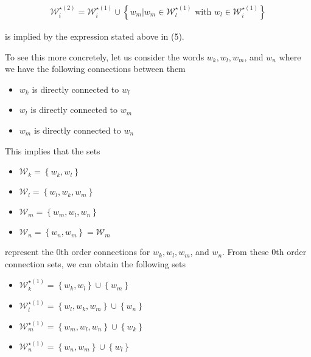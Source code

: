\documentclass{article}[12pt]
\begin{document}
\begin{flushleft}
\begin{align*}
\mathcal{W}^{\star (2)}_i = \mathcal{W}^{\star (1)}_i \cup \left\{ w_m | w_m \in \mathcal{W}^{\star (1)}_l \text{ with } w_l \in \mathcal{W}^{\star (1)}_i \right\}
\end{align*}

is implied by the expression stated above in (5). \newline


To see this more concretely, let us consider the words $w_k, w_l, w_m$, and $w_n$ where we have the following connections between them

\begin{itemize}
	\item $w_k$ is directly connected to $w_l$
	\item $w_l$ is directly connected to $w_m$
	\item $w_m$ is directly connected to $w_n$
\end{itemize}

This implies that the sets

\begin{multicols}{2}
	\begin{itemize}
		\item $\mathcal{W}_k = \left\{ w_k, w_l \right\}$
		\item $\mathcal{W}_l = \left\{ w_l, w_k, w_m \right\}$
		\item $\mathcal{W}_m = \left\{ w_m, w_l, w_n \right\}$
		\item $\mathcal{W}_n = \left\{ w_n, w_m \right\} = \mathcal{W}_m$
	\end{itemize}
\end{multicols}

represent the 0th order connections for $w_k, w_l, w_m$, and $w_n$. From these 0th order connection sets, we can obtain the following sets 

\begin{multicols}{2}
	\begin{itemize}
		\item $\mathcal{W}^{\star (1)}_k = \left\{ w_k, w_l \right\} \cup \left\{ w_m \right\}$
		\item $\mathcal{W}^{\star (1)}_l = \left\{ w_l, w_k, w_m \right\} \cup \left\{ w_n \right\}$
		\item $\mathcal{W}^{\star (1)}_m = \left\{ w_m, w_l, w_n \right\} \cup \left\{ w_k \right\}$
		\item $\mathcal{W}^{\star (1)}_n = \left\{ w_n, w_m \right\} \cup \left\{ w_l \right\}$
	\end{itemize}
\end{multicols}


\end{flushleft}
\end{document}
